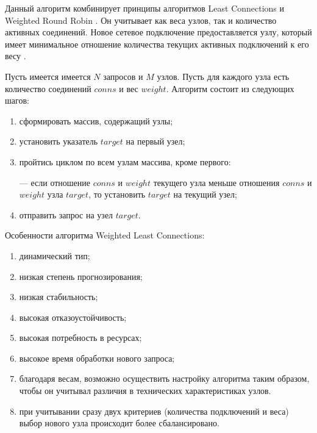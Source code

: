 Данный алгоритм комбинирует принципы алгоритмов Least Connections и Weighted Round Robin \cite{part_algos}. %
Он учитывает как веса узлов, так и количество активных соединений. 
Новое сетевое подключение предоставляется узлу, который имеет минимальное отношение количества текущих активных подключений к его весу \cite{mainsource}.

Пусть имеется имеется $N$ запросов и $M$ узлов. Пусть для каждого узла есть количество соединений $conns$ и вес $weight$.
Алгоритм состоит из следующих шагов:

\begin{enumerate}
	\item сформировать массив, содержащий узлы;
	\item установить указатель $target$ на первый узел;
	\item пройтись циклом по всем узлам массива, кроме первого:
	
	--- если отношение $conns$ и $weight$ текущего узла меньше отношения $conns$ и $weight$ узла $target$, то установить $target$ на текущий узел; 
	
	\item отправить запрос на узел $target$.
\end{enumerate}

Особенности алгоритма Weighted Least Connections:
\begin{enumerate}[label=---]
	\item динамический тип;
	\item низкая степень прогнозирования; 
	\item низкая стабильность;
	\item высокая отказоустойчивость;
	\item высокая потребность в ресурсах;
	\item высокое время обработки нового запроса;
	\item благодаря весам, возможно осуществить настройку алгоритма таким образом, чтобы он учитывал различия в технических характеристиках узлов.
	\item при учитывании сразу двух критериев (количества подключений и веса) выбор нового узла происходит более сбалансировано.
\end{enumerate}

